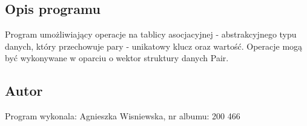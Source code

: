 \hypertarget{index_opis}{}\subsection{Opis programu}\label{index_opis}
Program umożliwiający operacje na tablicy asocjacyjnej -\/ abstrakcyjnego typu danych, który przechowuje pary -\/ unikatowy klucz oraz wartość. Operacje mogą być wykonywane w oparciu o wektor struktury danych Pair.\hypertarget{index_autor}{}\subsection{Autor}\label{index_autor}
Program wykonala\-: Agnieszka Wisniewska, nr albumu\-: 200 466 
